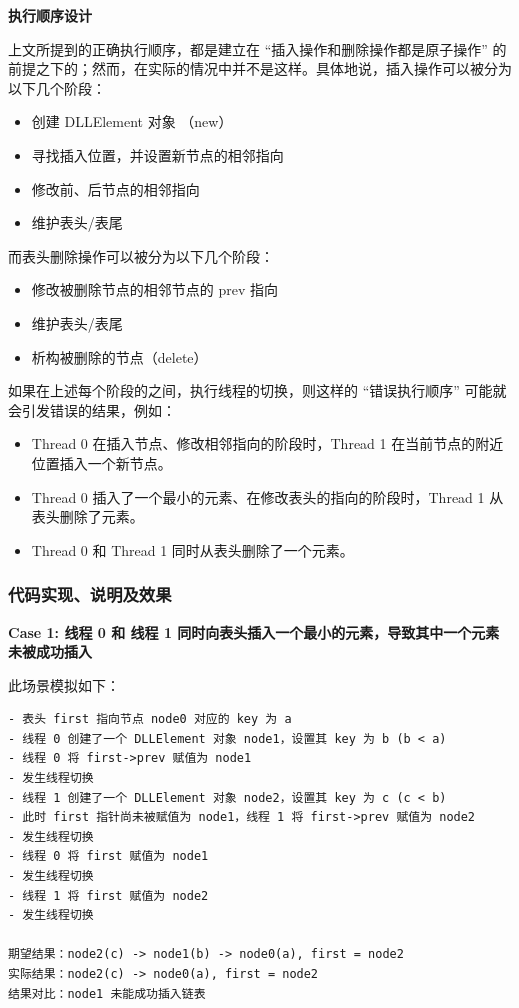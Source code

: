 \documentclass[a4paper,12pt]{article}
\begin{document}
\par\textbf{\hspace{1em}执行顺序设计}
\par 上文所提到的正确执行顺序，都是建立在 “插入操作和删除操作都是原子操作” 的前提之下的；然而，在实际的情况中并不是这样。具体地说，插入操作可以被分为以下几个阶段：
\begin{itemize}
\item 创建 DLLElement 对象 （new）
\item 寻找插入位置，并设置新节点的相邻指向
\item 修改前、后节点的相邻指向
\item 维护表头/表尾
\end{itemize}

\par 而表头删除操作可以被分为以下几个阶段：
\begin{itemize}
\item 修改被删除节点的相邻节点的 prev 指向
\item 维护表头/表尾
\item 析构被删除的节点（delete）    
\end{itemize}

\par 如果在上述每个阶段的之间，执行线程的切换，则这样的 “错误执行顺序” 可能就会引发错误的结果，例如：
\begin{itemize}
\item Thread 0 在插入节点、修改相邻指向的阶段时，Thread 1 在当前节点的附近位置插入一个新节点。
\item Thread 0 插入了一个最小的元素、在修改表头的指向的阶段时，Thread 1 从表头删除了元素。
\item Thread 0 和 Thread 1 同时从表头删除了一个元素。    
\end{itemize}

\subsubsection{代码实现、说明及效果}

\par\textbf{Case 1: 线程 0 和 线程 1 同时向表头插入一个最小的元素，导致其中一个元素未被成功插入}

此场景模拟如下：

\begin{verbatim}
- 表头 first 指向节点 node0 对应的 key 为 a
- 线程 0 创建了一个 DLLElement 对象 node1，设置其 key 为 b (b < a)
- 线程 0 将 first->prev 赋值为 node1
- 发生线程切换
- 线程 1 创建了一个 DLLElement 对象 node2，设置其 key 为 c (c < b)
- 此时 first 指针尚未被赋值为 node1，线程 1 将 first->prev 赋值为 node2
- 发生线程切换
- 线程 0 将 first 赋值为 node1
- 发生线程切换
- 线程 1 将 first 赋值为 node2
- 发生线程切换

期望结果：node2(c) -> node1(b) -> node0(a), first = node2
实际结果：node2(c) -> node0(a), first = node2
结果对比：node1 未能成功插入链表
\end{verbatim}
\end{document}

